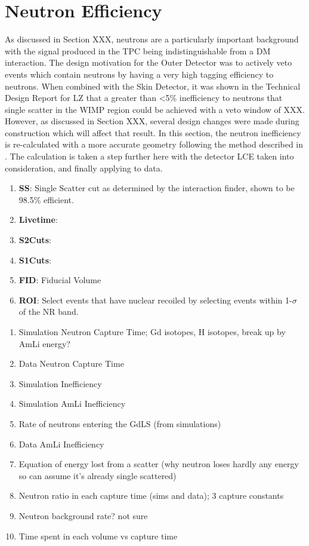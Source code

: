 \section{Neutron Efficiency}
\par
As discussed in Section XXX, neutrons are a particularly important background with the signal produced in the TPC being indistinguishable from a DM interaction.
The design motivation for the Outer Detector was to actively veto events which contain neutrons by having a very high tagging efficiency to neutrons.
When combined with the Skin Detector, it was shown in the Technical Design Report for LZ that a greater than <5\% inefficiency to neutrons that single scatter in the WIMP region could be achieved with a veto window of XXX.
However, as discussed in Section XXX, several design changes were made during construction which will affect that result.
In this section, the neutron inefficiency is re-calculated with a more accurate geometry following the method described in \cite{sallyshaw_thesis_ref}.
The calculation is taken a step further here with the detector LCE taken into consideration, and finally applying to data. 


\begin{enumerate}
    \item \textbf{SS}: Single Scatter cut as determined by the interaction finder, shown to be 98.5\% efficient.
    \item \textbf{Livetime}: 
    \item \textbf{S2Cuts}:
    \item \textbf{S1Cuts}:
    \item \textbf{FID}: Fiducial Volume
    \item \textbf{ROI}: Select events that have nuclear recoiled by selecting events within 1-$\sigma$ of the NR band.
\end{enumerate}



\begin{tcolorbox}[colback=red!5!white, colframe=red!50!black, title=Key Plots]
\begin{enumerate}
    \item Simulation Neutron Capture Time; Gd isotopes, H isotopes, break up by AmLi energy?
    \item Data Neutron Capture Time
    \item Simulation Inefficiency
    \item Simulation AmLi Inefficiency
    \item Rate of neutrons entering the GdLS (from simulations)
    \item Data AmLi Inefficiency
    \item Equation of energy lost from a scatter (why neutron loses hardly any energy so can assume it's already single scattered)
    \item Neutron ratio in each capture time (sims and data); 3 capture constants
    \item Neutron background rate? not sure
    \item Time spent in each volume vs capture time
\end{enumerate}
\end{tcolorbox}

